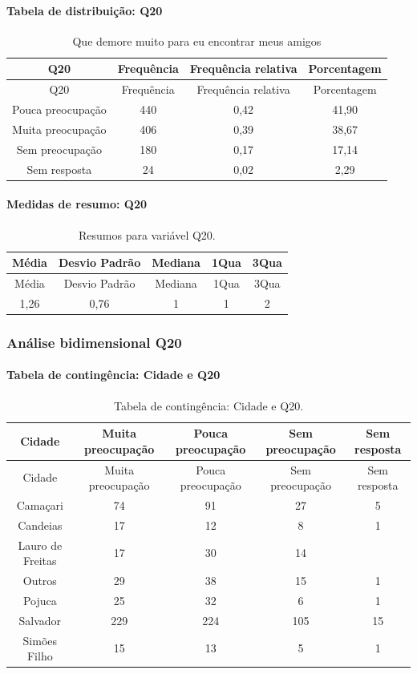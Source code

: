 \documentclass[]{article}
\let\oldparagraph\paragraph
\renewcommand{\paragraph}[1]{\oldparagraph{#1}\mbox{}}
\begin{document}
\hypertarget{tabela-de-distribuiuxe7uxe3o-q20}{%
\paragraph{Tabela de distribuição: Q20}\label{tabela-de-distribuiuxe7uxe3o-q20}}

\begin{longtable}[]{@{}cccc@{}}
\caption{\label{tab:unnamed-chunk-286}Que demore muito para eu encontrar meus amigos}\tabularnewline
\toprule
Q20 & Frequência & Frequência relativa & Porcentagem\tabularnewline
\midrule
\endfirsthead
\toprule
Q20 & Frequência & Frequência relativa & Porcentagem\tabularnewline
\midrule
\endhead
Pouca preocupação & 440 & 0,42 & 41,90\tabularnewline
Muita preocupação & 406 & 0,39 & 38,67\tabularnewline
Sem preocupação & 180 & 0,17 & 17,14\tabularnewline
Sem resposta & 24 & 0,02 & 2,29\tabularnewline
\bottomrule
\end{longtable}

\hypertarget{medidas-de-resumo-q20}{%
\paragraph{Medidas de resumo: Q20}\label{medidas-de-resumo-q20}}

\begin{longtable}[]{@{}ccccc@{}}
\caption{\label{tab:unnamed-chunk-287}Resumos para variável Q20.}\tabularnewline
\toprule
Média & Desvio Padrão & Mediana & 1Qua & 3Qua\tabularnewline
\midrule
\endfirsthead
\toprule
Média & Desvio Padrão & Mediana & 1Qua & 3Qua\tabularnewline
\midrule
\endhead
1,26 & 0,76 & 1 & 1 & 2\tabularnewline
\bottomrule
\end{longtable}

\cleardoublepage

\hypertarget{anuxe1lise-bidimensional-q20}{%
\subsubsection{Análise bidimensional Q20}\label{anuxe1lise-bidimensional-q20}}

\hypertarget{tabela-de-continguxeancia-cidade-e-q20}{%
\paragraph{Tabela de contingência: Cidade e Q20}\label{tabela-de-continguxeancia-cidade-e-q20}}

\begin{longtable}[]{@{}ccccc@{}}
\caption{\label{tab:unnamed-chunk-288}Tabela de contingência: Cidade e Q20.}\tabularnewline
\toprule
Cidade & Muita preocupação & Pouca preocupação & Sem preocupação & Sem resposta\tabularnewline
\midrule
\endfirsthead
\toprule
Cidade & Muita preocupação & Pouca preocupação & Sem preocupação & Sem resposta\tabularnewline
\midrule
\endhead
Camaçari & 74 & 91 & 27 & 5\tabularnewline
Candeias & 17 & 12 & 8 & 1\tabularnewline
Lauro de Freitas & 17 & 30 & 14 &\tabularnewline
Outros & 29 & 38 & 15 & 1\tabularnewline
Pojuca & 25 & 32 & 6 & 1\tabularnewline
Salvador & 229 & 224 & 105 & 15\tabularnewline
Simões Filho & 15 & 13 & 5 & 1\tabularnewline
\bottomrule
\end{longtable}
\end{document}
